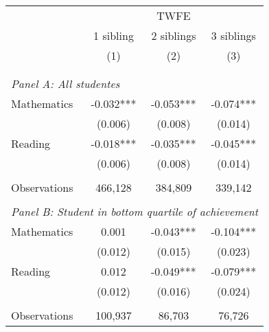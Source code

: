 \makeatletter
{}
{
\makeatother
\begin{tabular}{lccc}
\toprule
\cmidrule(lr){2-4}
& \multicolumn{3}{c}{TWFE} \\
\cmidrule(lr){2-4}
& 1 sibling & 2 siblings & 3 siblings  \\
\cmidrule(lr){2-2} \cmidrule(lr){3-3} \cmidrule(lr){4-4}
& (1) & (2) & (3)\\
\bottomrule
&  &  &  \\
&  &  &   \\
\multicolumn{4}{l}{\textit{Panel A: All studentes}} \\
\hspace{3mm}Mathematics&      -0.032***&      -0.053***&      -0.074***\\
                    &     (0.006)   &     (0.008)   &     (0.014)   \\
 
\hspace{3mm}Reading &      -0.018***&      -0.035***&      -0.045***\\
                    &     (0.006)   &     (0.008)   &     (0.014)   \\
                    &               &               &               \\
\hspace{3mm}Observations&     466,128   &     384,809   &     339,142   \\
 
&  &  &   \\
\multicolumn{4}{l}{\textit{Panel B: Student in bottom quartile of achievement}} \\
\hspace{3mm}Mathematics&       0.001   &      -0.043***&      -0.104***\\
                    &     (0.012)   &     (0.015)   &     (0.023)   \\
 
\hspace{3mm}Reading &       0.012   &      -0.049***&      -0.079***\\
                    &     (0.012)   &     (0.016)   &     (0.024)   \\
                    &               &               &               \\
\hspace{3mm}Observations&     100,937   &      86,703   &      76,726   \\
 

\end{tabular}}

